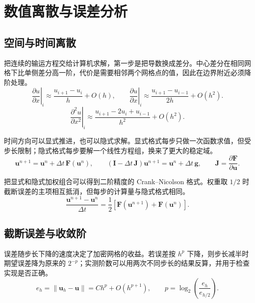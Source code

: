 \section{数值离散与误差分析}

\subsection{空间与时间离散}

把连续的输运方程交给计算机求解，第一步是把导数换成差分。中心差分在相同网格下比单侧差分高一阶，代价是需要相邻两个网格点的值，因此在边界附近必须降阶处理。
\begin{equation}
  \left.\frac{\partial u}{\partial x}\right|_i
  \approx\frac{u_{i+1}-u_i}{h}+O(h),\qquad
  \left.\frac{\partial u}{\partial x}\right|_i
  \approx\frac{u_{i+1}-u_{i-1}}{2h}+O(h^2).
  \label{eq:fd-stencils}
\end{equation}
\begin{equation}
  \left.\frac{\partial^2u}{\partial x^2}\right|_i
  \approx\frac{u_{i+1}-2u_i+u_{i-1}}{h^2}+O(h^2).
  \label{eq:fd-stencil-second}
\end{equation}

时间方向可以显式推进，也可以隐式求解。显式格式每步只做一次函数求值，但受步长限制；隐式格式每步要解一个线性方程组，换来了更大的稳定域。
\begin{equation}
  \bm{u}^{n+1}=\bm{u}^{n}+\Delta t\,\bm{F}(\bm{u}^{n}),\qquad
  (\bm{I}-\Delta t\,\bm{J})\bm{u}^{n+1}
    =\bm{u}^{n}+\Delta t\,\bm{g},\qquad
  \bm{J}=\frac{\partial\bm{F}}{\partial\bm{u}}.
  \label{eq:time-stepping}
\end{equation}

把显式和隐式加权组合可以得到二阶精度的 Crank--Nicolson 格式。权重取 $1/2$ 时截断误差的主项相互抵消，但每步的计算量与隐式格式相同。
\begin{equation}
  \frac{\bm{u}^{n+1}-\bm{u}^{n}}{\Delta t}
  =\frac{1}{2}\left[\bm{F}(\bm{u}^{n+1})+\bm{F}(\bm{u}^{n})\right].
  \label{eq:crank-nicolson}
\end{equation}

\subsection{截断误差与收敛阶}

误差随步长下降的速度决定了加密网格的收益。若误差按 $h^p$ 下降，则步长减半时期望误差降为原来的 $2^{-p}$；实测阶数可以用两次不同步长的结果反算，并用于检查实现是否正确。
\begin{equation}
  e_h=\|\bm{u}_h-\bm{u}\|=Ch^p+O(h^{p+1}),\qquad
  p=\log_2\left(\frac{e_h}{e_{h/2}}\right).
  \label{eq:convergence-order}
\end{equation}

